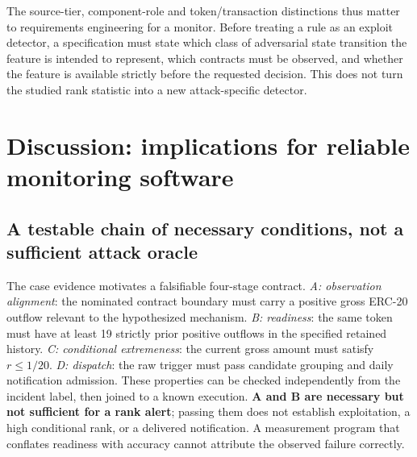 \documentclass[preprint,12pt,authoryear]{elsarticle}
\begin{document}
The source-tier, component-role and token/transaction distinctions thus matter to requirements engineering for a monitor. Before treating a rule as an exploit detector, a specification must state which class of adversarial state transition the feature is intended to represent, which contracts must be observed, and whether the feature is available strictly before the requested decision. This does not turn the studied rank statistic into a new attack-specific detector.

\section{Discussion: implications for reliable monitoring software}\label{sec:discussion}

\subsection{A testable chain of necessary conditions, not a sufficient attack oracle}
The case evidence motivates a falsifiable four-stage contract. \emph{A: observation alignment}: the nominated contract boundary must carry a positive gross ERC-20 outflow relevant to the hypothesized mechanism. \emph{B: readiness}: the same token must have at least 19 strictly prior positive outflows in the specified retained history. \emph{C: conditional extremeness}: the current gross amount must satisfy $r\leq1/20$. \emph{D: dispatch}: the raw trigger must pass candidate grouping and daily notification admission. These properties can be checked independently from the incident label, then joined to a known execution. \textbf{A and B are necessary but not sufficient for a rank alert}; passing them does not establish exploitation, a high conditional rank, or a delivered notification. A measurement program that conflates readiness with accuracy cannot attribute the observed failure correctly.
\end{document}
